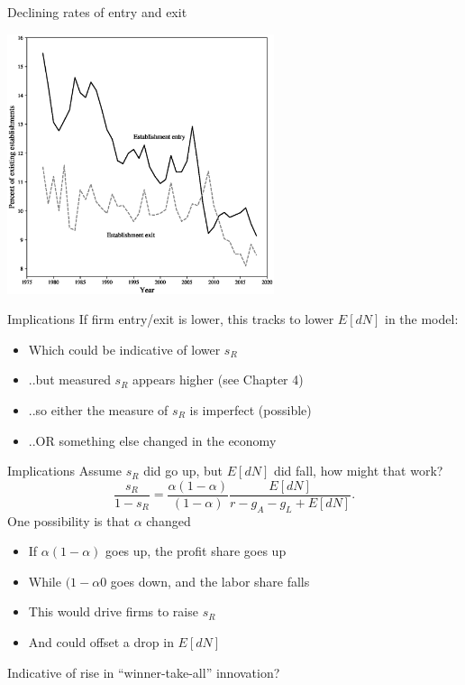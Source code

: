 \begin{frame}{Declining rates of entry and exit}
\begin{center}
\includegraphics[height=3in]{../Figures/fig-ch6-fig2.eps}
\end{center}
\end{frame}

\begin{frame}{Implications}
If firm entry/exit is lower, this tracks to lower $E[dN]$ in the model:
\begin{itemize}
	\item Which could be indicative of lower $s_R$
	\item ..but measured $s_R$ appears higher (see Chapter 4)
	\item ..so either the measure of $s_R$ is imperfect (possible)
	\item ..OR something else changed in the economy
\end{itemize}
\end{frame}

\begin{frame}{Implications}
Assume $s_R$ did go up, but $E[dN]$ did fall, how might that work?
\begin{equation}
	\frac{s_R}{1-s_R} = \frac{\alpha(1-\alpha)}{(1-\alpha)}\frac{E[dN]}{r-g_A-g_L+E[dN]}. \nonumber
\end{equation}
One possibility is that $\alpha$ changed
\begin{itemize}
	\item If $\alpha(1-\alpha)$ goes up, the profit share goes up
	\item While $(1-\alpha0$ goes down, and the labor share falls
	\item This would drive firms to raise $s_R$
	\item And could offset a drop in $E[dN]$
\end{itemize}
Indicative of rise in ``winner-take-all'' innovation? 
\end{frame}

